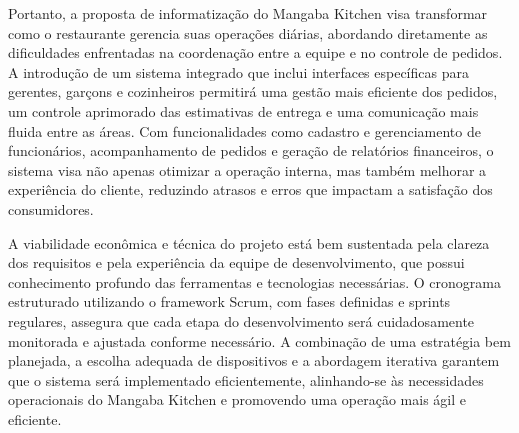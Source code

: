 \hspace{4.5mm}
Portanto, a proposta de informatização do Mangaba Kitchen visa transformar como o restaurante gerencia suas operações diárias, abordando diretamente as dificuldades enfrentadas na coordenação entre a equipe e no controle de pedidos. A introdução de um sistema integrado que inclui interfaces específicas para gerentes, garçons e cozinheiros permitirá uma gestão mais eficiente dos pedidos, um controle aprimorado das estimativas de entrega e uma comunicação mais fluida entre as áreas. Com funcionalidades como cadastro e gerenciamento de funcionários, acompanhamento de pedidos e geração de relatórios financeiros, o sistema visa não apenas otimizar a operação interna, mas também melhorar a experiência do cliente, reduzindo atrasos e erros que impactam a satisfação dos consumidores.
\par
A viabilidade econômica e técnica do projeto está bem sustentada pela clareza dos requisitos e pela experiência da equipe de desenvolvimento, que possui conhecimento profundo das ferramentas e tecnologias necessárias. O cronograma estruturado utilizando o framework Scrum, com fases definidas e sprints regulares, assegura que cada etapa do desenvolvimento será cuidadosamente monitorada e ajustada conforme necessário. A combinação de uma estratégia bem planejada, a escolha adequada de dispositivos e a abordagem iterativa garantem que o sistema será implementado eficientemente, alinhando-se às necessidades operacionais do Mangaba Kitchen e promovendo uma operação mais ágil e eficiente.